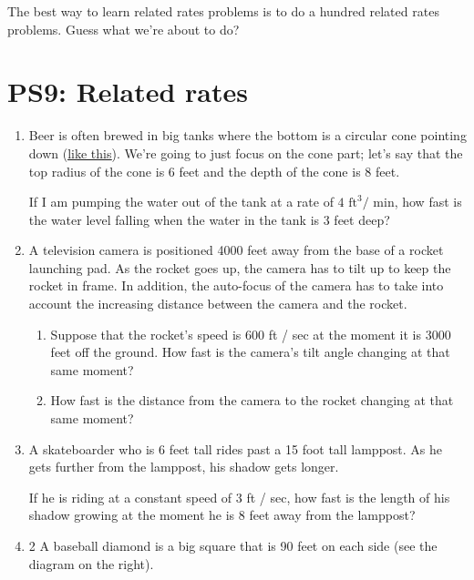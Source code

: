 The best way to learn related rates problems is to do a hundred related rates problems. Guess what we're about to do?

\pagebreak

\section{PS9: Related rates}


\everymath{\displaystyle}
\begin{enumerate}[leftmargin=0pt]

\item Beer is often brewed in big tanks where the bottom is a circular cone pointing down (\underline{\href{https://thumb.wikimedia.org/wikipedia/commons/thumb/8/87/Cuves_de_fermentations.jpg/960px-Cuves_de_fermentations.jpg}{like this}}). We're going to just focus on the cone part; let's say that the top radius of the cone is 6 feet and the depth of the cone is 8 feet. 

If I am pumping the water out of the tank at a rate of \(4 \text{ ft}^3 / \text{ min}\), how fast is the water level falling when the water in the tank is 3 feet deep?

\item A television camera is positioned 4000 feet away from the base of a rocket launching pad. As the rocket goes up, the camera has to tilt up to keep the rocket in frame. In addition, the auto-focus of the camera has to take into account the increasing distance between the camera and the rocket.
\begin{enumerate}
    \item Suppose that the rocket's speed is 600 ft / sec at the moment it is 3000 feet off the ground. How fast is the camera's tilt angle changing at that same moment?
    \item How fast is the distance from the camera to the rocket changing at that same moment?
\end{enumerate}

\item A skateboarder who is 6 feet tall rides past a 15 foot tall lamppost. As he gets further from the lamppost, his shadow gets longer. 

If he is riding at a constant speed of 3 ft / sec, how fast is the length of his shadow growing at the moment he is 8 feet away from the lamppost?

\item 
\begin{multicols}{2}
A baseball diamond is a big square that is 90 feet on each side (see the diagram on the right). 


\end{multicols}
\end{enumerate}
